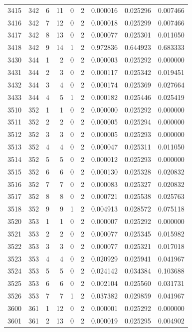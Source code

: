 \begin{longtable}{rrrrrrrrr}
3415 & 342 & 6 & 11 & 0 & 2 & 0.000016 & 0.025296 & 0.007466 \\
3416 & 342 & 7 & 12 & 0 & 2 & 0.000018 & 0.025299 & 0.007466 \\
3417 & 342 & 8 & 13 & 0 & 2 & 0.000077 & 0.025301 & 0.011050 \\
3418 & 342 & 9 & 14 & 1 & 2 & 0.972836 & 0.644923 & 0.683333 \\
3430 & 344 & 1 & 2 & 0 & 2 & 0.000003 & 0.025292 & 0.000000 \\
3431 & 344 & 2 & 3 & 0 & 2 & 0.000117 & 0.025342 & 0.019451 \\
3432 & 344 & 3 & 4 & 0 & 2 & 0.000174 & 0.025369 & 0.027664 \\
3433 & 344 & 4 & 5 & 1 & 2 & 0.000182 & 0.025446 & 0.025419 \\
3510 & 352 & 1 & 1 & 0 & 2 & 0.000000 & 0.025292 & 0.000000 \\
3511 & 352 & 2 & 2 & 0 & 2 & 0.000005 & 0.025294 & 0.000000 \\
3512 & 352 & 3 & 3 & 0 & 2 & 0.000005 & 0.025293 & 0.000000 \\
3513 & 352 & 4 & 4 & 0 & 2 & 0.000047 & 0.025311 & 0.011050 \\
3514 & 352 & 5 & 5 & 0 & 2 & 0.000012 & 0.025293 & 0.000000 \\
3515 & 352 & 6 & 6 & 0 & 2 & 0.000130 & 0.025328 & 0.020832 \\
3516 & 352 & 7 & 7 & 0 & 2 & 0.000083 & 0.025327 & 0.020832 \\
3517 & 352 & 8 & 8 & 0 & 2 & 0.000721 & 0.025538 & 0.025763 \\
3518 & 352 & 9 & 9 & 1 & 2 & 0.004913 & 0.028572 & 0.075118 \\
3520 & 353 & 1 & 1 & 0 & 2 & 0.000007 & 0.025292 & 0.000000 \\
3521 & 353 & 2 & 2 & 0 & 2 & 0.000077 & 0.025345 & 0.015982 \\
3522 & 353 & 3 & 3 & 0 & 2 & 0.000077 & 0.025321 & 0.017018 \\
3523 & 353 & 4 & 4 & 0 & 2 & 0.020929 & 0.025941 & 0.041967 \\
3524 & 353 & 5 & 5 & 0 & 2 & 0.024142 & 0.034384 & 0.103688 \\
3525 & 353 & 6 & 6 & 0 & 2 & 0.002104 & 0.025560 & 0.031731 \\
3526 & 353 & 7 & 7 & 1 & 2 & 0.037382 & 0.029859 & 0.041967 \\
3600 & 361 & 1 & 12 & 0 & 2 & 0.000001 & 0.025292 & 0.000000 \\
3601 & 361 & 2 & 13 & 0 & 2 & 0.000019 & 0.025295 & 0.004902 \\

\end{longtable}
